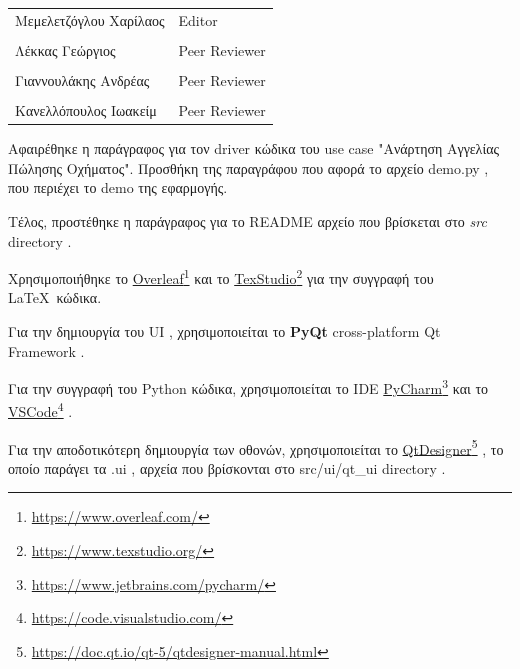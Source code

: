 \documentclass{../ol-softwaremanual}
\newcommand{\doclink}[2]{\href{#1}{#2}\footnote{\url{#1}}}
\begin{document}
	
	\vspace{20pt}
	
	\begin{table}[htbp!]
		\begin{tabular}{ll}
			Μεμελετζόγλου Χαρίλαος & \en Editor \\
			\\ Λέκκας Γεώργιος      &   \en  Peer Reviewer \\
			\\ Γιαννουλάκης Ανδρέας & \en Peer Reviewer \\
			\\ Κανελλόπουλος Ιωακείμ & \en Peer Reviewer \\ 
		\end{tabular}
	\end{table}
	
	\vspace{10pt}
	\vspace{10pt}
	\flushleft
	
	Αφαιρέθηκε η παράγραφος για τον \en driver \gr κώδικα του \en use case "\gr Ανάρτηση Αγγελίας Πώλησης Οχήματος\en"\gr. Προσθήκη της παραγράφου που αφορά το αρχείο \en demo.py \gr, που περιέχει το \en demo \gr της εφαρμογής. \break
	
	Τέλος, προστέθηκε η παράγραφος για το \en README \gr αρχείο που βρίσκεται στο \en \textit{src} directory \gr.

	
	
	
	\newpage
	
	
	\vspace{20pt}
	\flushleft
	Χρησιμοποιήθηκε το \en \doclink{https://www.overleaf.com/}{Overleaf} \gr και το \en \doclink{https://www.texstudio.org/}{TexStudio} \gr για την συγγραφή του \LaTeX\ κώδικα. \break
	
	Για την δημιουργία του \en UI \gr, χρησιμοποιείται το \en \textbf{PyQt} cross-platform Qt Framework \gr. \break
	
	Για την συγγραφή του \en Python \gr κώδικα, χρησιμοποιείται το \en IDE \doclink{https://www.jetbrains.com/pycharm/}{PyCharm} \gr και το \en \doclink{https://code.visualstudio.com/}{VSCode} \gr .  \break 
	
	Για την αποδοτικότερη δημιουργία των οθονών, χρησιμοποιείται το \en \doclink{https://doc.qt.io/qt-5/qtdesigner-manual.html}{QtDesigner} \gr, το οποίο παράγει τα \en .ui \gr, αρχεία που βρίσκονται στο \en src/ui/qt\_ui directory \gr . \break
	
\end{document}
